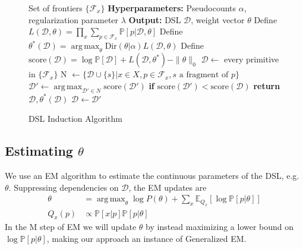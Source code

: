 \documentclass{article}
\DeclareMathOperator*{\argmax}{arg\,max} %
\newcommand{\expect}{\mathds{E}} %
\newcommand{\probability}{\mathds{P}} %
\begin{document}
\begin{figure}[H]
  \centering
  \begin{minipage}{0.675\textwidth}    
    \begin{algorithm}[H]
    \setcounter{algorithm}{2} %
       \caption{DSL Induction Algorithm}
       \label{grammarInductionAlgorithm}
       \begin{algorithmic}
          Set of frontiers $\{\mathcal{F}_x\}$
         \STATE \textbf{Hyperparameters:} Pseudocounts $\alpha$, regularization parameter $\lambda$
         \STATE \textbf{Output:} DSL $\mathcal{D}$, weight vector $\theta$
         \STATE Define $L(\mathcal{D},\theta) =  \prod_x \sum_{p\in \mathcal{F}_x} \probability[p|\mathcal{D},\theta]$
         \STATE Define $\theta^*(\mathcal{D}) = \argmax_\theta \text{Dir}(\theta|\alpha) L(\mathcal{D},\theta)$
         \STATE Define $\text{score}(\mathcal{D}) = \log \probability[\mathcal{D}] + L(\mathcal{D},\theta^*) - \|\theta\|_0$
         \STATE $\mathcal{D}\gets$ every primitive in $\{\mathcal{F}_x\}$
         \STATE N $\gets \{\mathcal{D}\cup \{s\} | x\in X, p\in \mathcal{F}_x, s\text{ a fragment  of }p\}$
         \STATE $\mathcal{D}'\gets \argmax_{\mathcal{D}'\in N}\text{score}(\mathcal{D}') $
         \STATE \textbf{if }$\text{score}(\mathcal{D}') < \text{score}(\mathcal{D})$\textbf{ return }$\mathcal{D},\theta^*(\mathcal{D})$
         \STATE $\mathcal{D}\gets\mathcal{D}'$
         \ENDWHILE
       \end{algorithmic}
    \end{algorithm}
  \end{minipage}
\end{figure}

\subsection{Estimating $\theta$}

We use an EM algorithm to estimate the continuous parameters of the DSL, e.g. $\theta$.
Suppressing dependencies on $\mathcal{D}$, the EM updates are
\begin{align}
\label{maximizeStep}  \theta& = \argmax_\theta \log P(\theta) + \sum_x \expect_{Q_x}\left[\log \probability\left[p|\theta \right] \right]\\
  Q_x(p)&\propto \probability[x|p]\probability[p|\theta]
  \end{align}
In the M step of EM we will update $\theta$ by instead maximizing a lower bound on $\log \probability[p|\theta]$,
making our approach an instance of Generalized EM.
\end{document}
